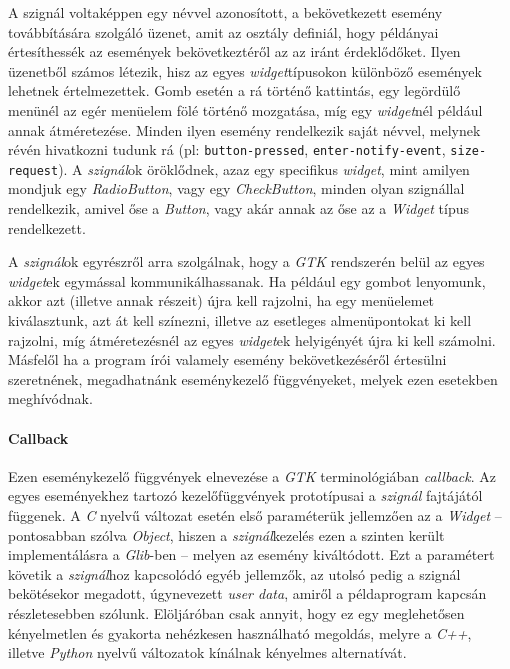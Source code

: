 A szignál voltaképpen egy névvel azonosított, a bekövetkezett esemény továbbítására szolgáló üzenet, amit az osztály definiál, hogy példányai értesíthessék az események bekövetkeztéről az az iránt érdeklődőket. Ilyen üzenetből számos létezik, hisz az egyes \textit{widget}típusokon különböző események lehetnek értelmezettek. Gomb esetén a rá történő kattintás, egy legördülő menünél az egér menüelem fölé történő mozgatása, míg egy \textit{widget}nél például annak átméretezése. Minden ilyen esemény rendelkezik saját névvel, melynek révén hivatkozni tudunk rá (pl: \texttt{button-pressed}, \texttt{enter-notify-event}, \texttt{size-request}). A \textit{szignál}ok öröklődnek, azaz egy specifikus \textit{widget}, mint amilyen mondjuk egy \textit{RadioButton}, vagy egy \textit{CheckButton}, minden olyan szignállal rendelkezik, amivel őse a \textit{Button}, vagy akár annak az őse az a \textit{Widget} típus rendelkezett.

A \textit{szignál}ok egyrészről arra szolgálnak, hogy a \textit{GTK} rendszerén belül az egyes \textit{widget}ek egymással kommunikálhassanak. Ha például egy gombot lenyomunk, akkor azt (illetve annak részeit) újra kell rajzolni, ha egy menüelemet kiválasztunk, azt át kell színezni, illetve az esetleges almenüpontokat ki kell rajzolni, míg átméretezésnél az egyes \textit{widget}ek helyigényét újra ki kell számolni. Másfelől ha a program írói valamely esemény bekövetkezéséről értesülni szeretnének, megadhatnánk eseménykezelő függvényeket, melyek ezen esetekben meghívódnak.

\paragraph{Callback}

Ezen eseménykezelő függvények elnevezése a \textit{GTK} terminológiában \textit{callback}. Az egyes eseményekhez tartozó kezelőfüggvények prototípusai a \textit{szignál} fajtájától függenek. A \textit{C} nyelvű változat esetén első paraméterük jellemzően az a \textit{Widget} -- pontosabban szólva \textit{Object}, hiszen a \textit{szignál}kezelés ezen a szinten került implementálásra a \textit{Glib}-ben -- melyen az esemény kiváltódott. Ezt a paramétert követik a \textit{szignál}hoz kapcsolódó egyéb jellemzők, az utolsó pedig a szignál bekötésekor megadott, úgynevezett \textit{user data}, amiről a példaprogram kapcsán részletesebben szólunk. Elöljáróban csak annyit, hogy ez egy meglehetősen kényelmetlen és gyakorta nehézkesen használható megoldás, melyre a \textit{C++}, illetve \textit{Python} nyelvű változatok kínálnak kényelmes alternatívát.

